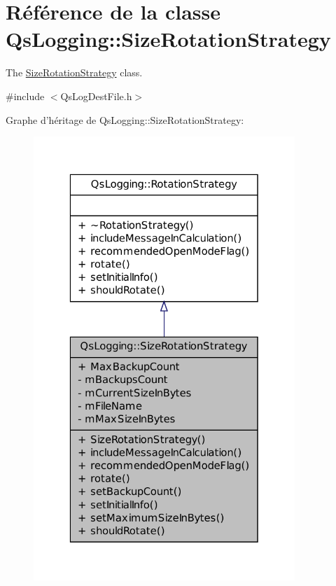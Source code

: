 \hypertarget{classQsLogging_1_1SizeRotationStrategy}{\section{Référence de la classe Qs\-Logging\-:\-:Size\-Rotation\-Strategy}
\label{classQsLogging_1_1SizeRotationStrategy}
}


The \hyperlink{classQsLogging_1_1SizeRotationStrategy}{Size\-Rotation\-Strategy} class.  




{\ttfamily \#include $<$Qs\-Log\-Dest\-File.\-h$>$}



Graphe d'héritage de Qs\-Logging\-:\-:Size\-Rotation\-Strategy\-:
\nopagebreak
\begin{figure}[H]
\begin{center}
\leavevmode
\includegraphics[width=280pt]{classQsLogging_1_1SizeRotationStrategy__inherit__graph}
\end{center}
\end{figure}


